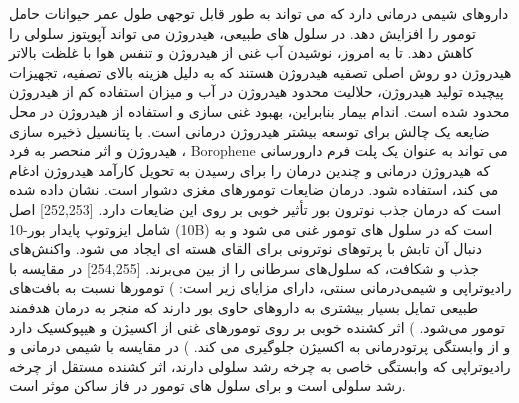 داروهای شیمی درمانی دارد که می تواند به طور قابل توجهی طول عمر حیوانات حامل تومور را افزایش دهد. در سلول های طبیعی، هیدروژن می تواند آپوپتوز سلولی را کاهش دهد. تا به امروز، نوشیدن آب غنی از هیدروژن و تنفس هوا با غلظت بالاتر هیدروژن دو روش اصلی تصفیه هیدروژن هستند که به دلیل هزینه بالای تصفیه، تجهیزات پیچیده تولید هیدروژن، حلالیت محدود هیدروژن در آب و میزان استفاده کم از هیدروژن محدود شده است. اندام بیمار بنابراین، بهبود غنی سازی و استفاده از هیدروژن در محل ضایعه یک چالش برای توسعه بیشتر هیدروژن درمانی است. با پتانسیل ذخیره سازی هیدروژن و اثر منحصر به فرد ، \gls{Borophene} می تواند به عنوان یک پلت فرم دارورسانی که هیدروژن درمانی و چندین درمان را برای رسیدن به تحویل کارآمد هیدروژن ادغام می کند، استفاده شود. درمان ضایعات تومورهای مغزی دشوار است. نشان داده شده است که درمان جذب نوترون بور  تأثیر خوبی بر روی این ضایعات دارد. [252,253] اصل  شامل ایزوتوپ پایدار بور-10 (10B) است که در سلول های تومور غنی می شود و به دنبال آن تابش با پرتوهای نوترونی برای القای هسته ای ایجاد می شود. واکنش‌های جذب و شکافت، که سلول‌های سرطانی را از بین می‌برند. [254,255] در مقایسه با رادیوتراپی و شیمی‌درمانی سنتی،  دارای مزایای زیر است: ) تومورها نسبت به بافت‌های طبیعی تمایل بسیار بیشتری به داروهای حاوی بور دارند که منجر به درمان هدفمند تومور می‌شود. )  اثر کشنده خوبی بر روی تومورهای غنی از اکسیژن و هیپوکسیک دارد و از وابستگی پرتودرمانی به اکسیژن جلوگیری می کند. ) در مقایسه با شیمی درمانی و رادیوتراپی که وابستگی خاصی به چرخه رشد سلولی دارند، اثر کشنده  مستقل از چرخه رشد سلولی است و برای سلول های تومور در فاز ساکن موثر است.
